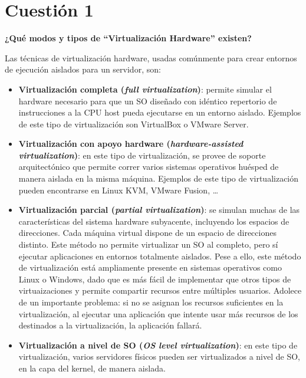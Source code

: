 \documentclass[a4paper,11pt]{article}
\newenvironment{answer}{%
\begin{list}{}{%
}%
\item[]}{\end{list}}
\newcommand{\imagent}[4]{
  \begin{figure}
    \begin{center}
    \texttt{[image: \#1]}
    \end{center}
    \caption{#3}
    \label{#4}
  \end{figure}
}
\newcommand{\imagen}[4]{
  \begin{minipage}{\linewidth}
    \centering
    \texttt{[image: \#1]}
    \captionof{figure}{#2}
    \label{#3}
  \end{minipage} 
}
\begin{document}
\newpage
\tableofcontents
\newpage

\section{Cuestión 1}
\textbf{¿Qué modos y tipos de “Virtualización Hardware” existen?}
\begin{answer}
 Las técnicas de virtualización hardware, usadas comúnmente para crear entornos de ejecución aislados para un 
 servidor, son: \cite{hardv} \cite{virt}
 \begin{itemize}
  \item \textbf{Virtualización completa (\textit{full virtualization})}: permite simular el hardware necesario
  para que un SO diseñado con idéntico repertorio de instrucciones a la CPU host pueda ejecutarse en un entorno
  aislado. Ejemplos de este tipo de virtualización son VirtualBox o VMware Server.
  \item \textbf{Virtualización con apoyo hardware (\textit{hardware-assisted virtualization})}: en este tipo
  de virtualización, se provee de soporte arquitectónico que permite correr varios sistemas operativos 
  huésped de manera aislada en la misma máquina. Ejemplos de este tipo de virtualización pueden encontrarse
  en Linux KVM, VMware Fusion, \ldots
  \item \textbf{Virtualización parcial (\textit{partial virtualization})}: se simulan muchas de las características
  del sistema hardware subyacente, incluyendo los espacios de direcciones. Cada máquina virtual dispone de un
  espacio de direcciones distinto. Este método no permite virtualizar un SO al completo, pero sí ejecutar
  aplicaciones en entornos totalmente aislados. Pese a ello, este método de virtualización está ampliamente
  presente en sistemas operativos como Linux o Windows, dado que es más fácil de implementar que otros
  tipos de virtuaizaciones y permite compartir recursos entre múltiples usuarios. Adolece de un importante problema:
  si no se asignan los recursos suficientes en la virtualización, al ejecutar una aplicación que intente
  usar más recursos de los destinados a la virtualización, la aplicación fallará.
  \item \textbf{Virtualización a nivel de SO (\textit{OS level virtualization})}: en este tipo de virtualización,
  varios servidores físicos pueden ser virtualizados a nivel de SO, en la capa del kernel, de manera aislada. 

\end{itemize}
\end{answer}
\end{document}
